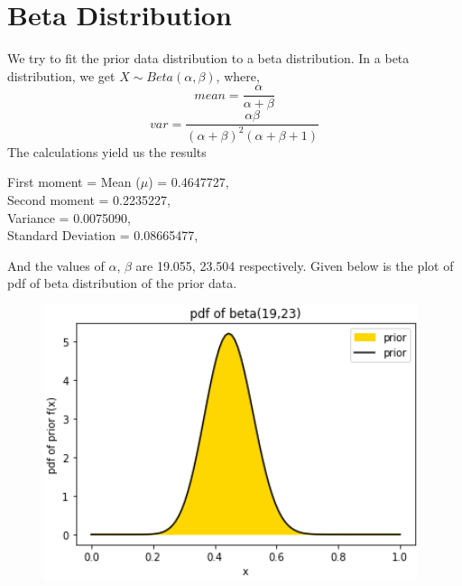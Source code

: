 \documentclass[journal,12pt,twocolumn]{IEEEtran}
\begin{document}
\section{Beta Distribution}
We try to fit the prior data distribution to a beta distribution.\newline
In a beta distribution, we get $X \sim Beta(\alpha, \beta)$, where,
\begin{equation}
    mean = \frac{\alpha}{\alpha + \beta}
\end{equation}
\begin{equation}
     var = \frac{\alpha\beta}{(\alpha + \beta)^2(\alpha + \beta + 1)}
\end{equation}
The calculations yield us the results
\begin{center}
First moment = Mean ($\mu$) = 0.4647727,\\
Second moment = 0.2235227,\\
Variance = 0.0075090,\\
Standard Deviation = 0.08665477,\\
\end{center}
And the values of $\alpha$, $\beta$ are 19.055, 23.504 respectively.
Given below is the plot of pdf of beta distribution of the prior data.
\begin{figure}[!ht]
\centering
\includegraphics[width=\columnwidth]{Images/Pdf_beta_prior.png}
\label{fig:yndft}
\end{figure}
\end{document}
